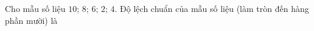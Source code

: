 \begin{ex}
Cho mẫu số liệu $10$; $8$; $6$; $2$; $4$. Độ lệch chuẩn của mẫu số liệu (làm tròn đến hàng phần mười) là
\end{ex}
